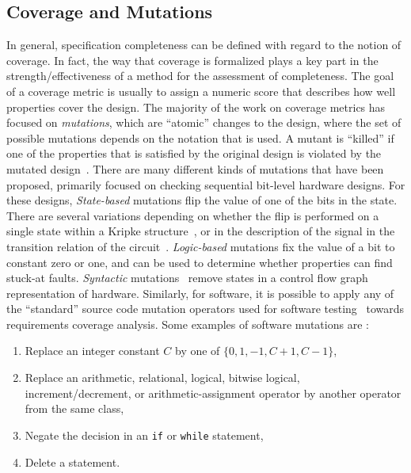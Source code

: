 \subsection{Coverage and Mutations}
In general, specification completeness can be defined with
regard to the notion of coverage. In fact, the way that coverage
is formalized plays a key part in the strength/effectiveness of
a method for the assessment of completeness. The goal of a coverage metric is usually to assign a numeric score that describes how well properties cover the design. The majority of the work on coverage metrics has focused on {\em mutations}, which are ``atomic'' changes to the design, where the set of possible mutations depends on the notation that is used.  A mutant is ``killed'' if one of the properties that is satisfied by the original design is violated by the mutated design~\cite{chockler_coverage_2003,chockler2001practical,chockler2010coverage,Kupferman:2006:SCF,kupferman_theory_2008}.  There are many different kinds of mutations that have been proposed, primarily focused on checking sequential bit-level hardware designs.  For these designs, {\em State-based} mutations flip the value of one of the bits in the state.  There are several variations depending on whether the flip is performed on a single state within a Kripke structure~\cite{hoskote1999coverage}, or in the description of the signal in the transition relation of the circuit~\cite{chockler2001practical}.  {\em Logic-based} mutations fix the value of a bit to constant zero or one, and can be used to determine whether properties can find stuck-at faults.  {\em Syntactic} mutations~\cite{chockler_coverage_2003} remove states in a control flow graph representation of hardware.  Similarly, for software, it is possible to apply any of the ``standard'' source code mutation operators used for software testing~\cite{Andrews06:mutation} towards requirements coverage analysis.  Some examples of software mutations are \cite{}:
\begin{enumerate}
    \item Replace an integer constant $C$ by one of $\{0, 1, -1, C + 1, C - 1\}$,
    \item Replace an arithmetic, relational, logical, bitwise logical, increment/decrement, or arithmetic-assignment operator by another operator from the same class,
    \item Negate the decision in an \texttt{if} or \texttt{while} statement,
    \item Delete a statement.
\end{enumerate}

